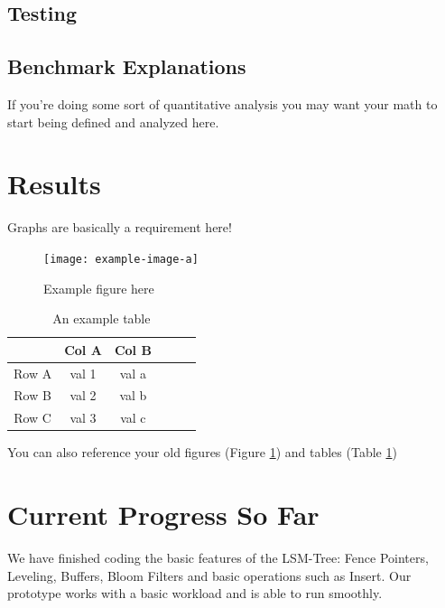 \documentclass[sigconf]{acmart}
\begin{document}
\subsection{Testing}

\subsection{Benchmark Explanations}

If you're doing some sort of quantitative analysis you may want your math to 
start being defined and analyzed here.


\section{Results}
Graphs are basically a requirement here!

\begin{figure}[ht]
    \texttt{[image: example-image-a]}
    \caption{Example figure here}
    \label{fig:filler}
\end{figure}

\begin{table}[H]
    \caption{An example table}
    \label{tab:ex}
    \centering

    \begin{tabular}{c |c c c c c}
        \hline\hline
        & Col A & Col B \\
        \hline
        Row A & val 1 & val a \\
        Row B & val 2 & val b \\
        Row C & val 3 & val c \\
    \hline
    \end{tabular}
\end{table}

You can also reference your old figures (Figure \ref{fig:filler}) and tables 
(Table \ref{tab:ex})

\section{Current Progress So Far}

We have finished coding the basic features of the LSM-Tree: Fence Pointers, Leveling, Buffers, Bloom Filters and basic operations such as Insert. Our prototype works with a basic workload and is able to run smoothly.
\end{document}
